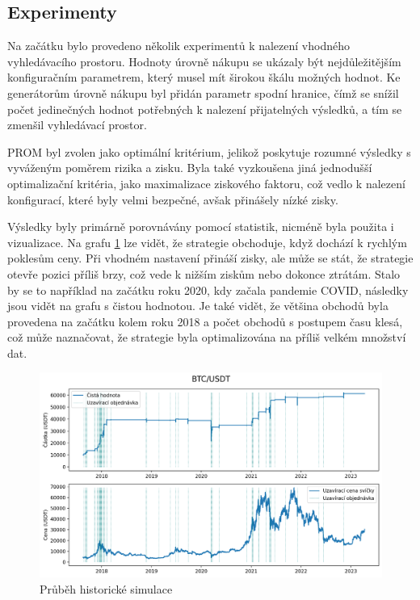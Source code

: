 \subsection{Experimenty}
Na začátku bylo provedeno několik experimentů k nalezení vhodného vyhledávacího prostoru.
Hodnoty úrovně nákupu se ukázaly být nejdůležitějším konfiguračním parametrem, který musel mít širokou škálu možných hodnot.
Ke generátorům úrovně nákupu byl přidán parametr spodní hranice, čímž se snížil počet jedinečných hodnot potřebných k nalezení přijatelných výsledků, a tím se zmenšil vyhledávací prostor.

PROM byl zvolen jako optimální kritérium, jelikož poskytuje rozumné výsledky s vyváženým poměrem rizika a zisku.
Byla také vyzkoušena jiná jednodušší optimalizační kritéria, jako maximalizace ziskového faktoru, což vedlo k nalezení konfigurací, které byly velmi bezpečné, avšak přinášely nízké zisky.

Výsledky byly primárně porovnávány pomocí statistik, nicméně byla použita i vizualizace.
Na grafu \ref{fig:btc-historical-simulation} lze vidět, že strategie obchoduje, když dochází k rychlým poklesům ceny.
Při vhodném nastavení přináší zisky, ale může se stát, že strategie otevře pozici příliš brzy, což vede k nižším ziskům nebo dokonce ztrátám.
Stalo by se to například na začátku roku 2020, kdy začala pandemie COVID, následky jsou vidět na grafu s čistou hodnotou.
Je také vidět, že většina obchodů byla provedena na začátku kolem roku 2018 a počet obchodů s postupem času klesá, což může naznačovat, že strategie byla optimalizována na příliš velkém množství dat.

\begin{figure}[htbp]
\centerline{\includegraphics[scale=0.6]{img/btc-historical-simulation.png}}
\caption{Průběh historické simulace}
\label{fig:btc-historical-simulation}
\end{figure}

